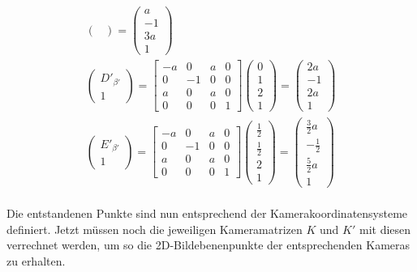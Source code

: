 \begin{gather}
\begin{pmatrix}
	\end{pmatrix}
	=
	\begin{pmatrix}
		a\\-1\\3a\\1
	\end{pmatrix}\\
	\begin{pmatrix}
		D'_{\beta'}\\1
	\end{pmatrix}
	=
	\begin{bmatrix}
		-a&0&a&0\\
		0&-1&0&0\\
		a&0&a&0\\
		0&0&0&1
	\end{bmatrix}
	\begin{pmatrix}
		0\\1\\2\\1
	\end{pmatrix}
	=
	\begin{pmatrix}
		2a\\-1\\2a\\1
	\end{pmatrix}\\
	\begin{pmatrix}
	E'_{\beta'}\\1
\end{pmatrix}
=
\begin{bmatrix}
	-a&0&a&0\\
	0&-1&0&0\\
	a&0&a&0\\
	0&0&0&1
\end{bmatrix}
\begin{pmatrix}
	\frac{1}{2}\\\frac{1}{2}\\2\\1
\end{pmatrix}
=
\begin{pmatrix}
	\frac{3}{2}a\\-\frac{1}{2}\\\frac{5}{2}a\\1
\end{pmatrix}
\end{gather}\\

Die entstandenen Punkte sind nun entsprechend der Kamerakoordinatensysteme definiert. Jetzt müssen noch die jeweiligen Kameramatrizen $K$ und $K'$ mit diesen verrechnet werden, um so die 2D-Bildebenenpunkte der entsprechenden Kameras zu erhalten.

